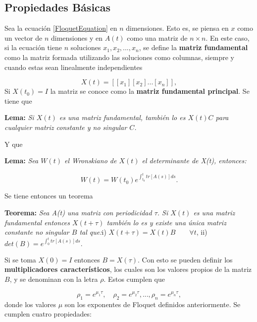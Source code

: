 \documentclass[a4paper,10pt]{report}
\begin{document}
\subsection{Propiedades Básicas}

Sea la ecuación \eqref{FloquetEquation} en $n$ dimensiones. Esto es, se piensa en $x$ como un vector de $n$ dimensiones y en $A(t)$ como una matriz de $n \times n$. En este caso, si la ecuación tiene $n$ soluciones $x_1, x_2, ... , x_n$, se define la \textbf{matriz fundamental} como la matriz formada utilizando las soluciones como columnas, siempre y cuando estas sean linealmente independientes

\begin{equation}
X(t) = [[x_1][x_2]...[x_n]],
\end{equation}Si $X(t_0) = I$ la matriz se conoce como la \textbf{matriz fundamental principal}. Se tiene que

\begin{center}
\textbf{Lema:} \textit{Si $X(t)$ es una matriz fundamental, también lo es $X(t)C$ para cualquier matriz constante y no singular $C$.}
\end{center}Y que

\begin{center}
\textbf{Lema:} \textit{Sea $W(t)$ el Wronskiano de $X(t)$ el determinante de X(t), entonces:}

\begin{equation}
W(t) = W(t_0) e^{\int_{t_0}^{t}tr[A(s)]ds}.
\end{equation}
 
\end{center} Se tiene entonces un teorema

\begin{center}
\textbf{Teorema:} \textit{Sea A(t) una matriz con periodicidad $\tau$. Si $X(t)$ es una matriz fundamental entonces $X(t+\tau)$ también lo es y existe una única matriz constante no singular $B$ tal que:}\linebreak \linebreak i) $X(t+\tau) = X(t)B \qquad\forall t$, \linebreak ii) $det(B) = e^{\int_0^t tr[A(s)]ds}.$
\end{center}Si se toma $X(0)=I$ entonces $B=X(\tau)$. Con esto se pueden definir los \textbf{multiplicadores característicos}, los cuales son los valores propios de la matriz $B$, y se denominan con la letra $\rho$. Estos cumplen que

\begin{equation}
\rho_1 = e^{\mu_1 \tau}, \quad \rho_2 = e^{\mu_2 \tau}, ... , \rho_n = e^{\mu_n \tau},
\end{equation} donde los valores $\mu$ son los exponentes de Floquet definidos anteriormente. Se cumplen cuatro propiedades:
\end{document}
